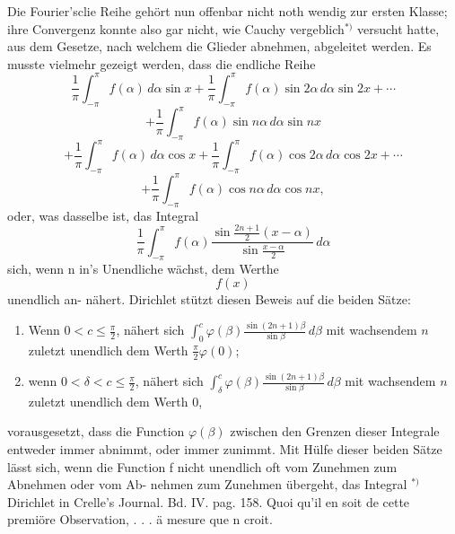 \documentclass[11pt,a4paper]{article}
\begin{document}
Die  Fourier'sclie  Reihe  gehört  nun  offenbar  nicht  noth wendig
zur  ersten  Klasse;  ihre  Convergenz  konnte  also  gar  nicht,  wie  Cauchy
vergeblich$^{*)}$  versucht  hatte,  aus  dem  Gesetze,  nach  welchem  die  Glieder
abnehmen,  abgeleitet  werden.  Es  musste  vielmehr  gezeigt  werden,  dass
die  endliche  Reihe
\[
\frac{1}{\pi} \int_{-\pi}^{\pi} f(\alpha)\, d\alpha \sin x + \frac{1}{\pi} \int_{-\pi}^{\pi} f(\alpha) \sin 2\alpha\, d\alpha \sin 2x + \cdots
\]
\[
+ \frac{1}{\pi} \int_{-\pi}^{\pi} f(\alpha) \sin n\alpha\, d\alpha \sin nx
\]
\[
+ \frac{1}{\pi} \int_{-\pi}^{\pi} f(\alpha)\, d\alpha \cos x + \frac{1}{\pi} \int_{-\pi}^{\pi} f(\alpha) \cos 2\alpha\, d\alpha \cos 2x + \cdots
\]
\[
+ \frac{1}{\pi} \int_{-\pi}^{\pi} f(\alpha) \cos n\alpha\, d\alpha \cos nx,
\]
oder,  was  dasselbe  ist,  das  Integral
\[
\frac{1}{\pi} \int_{-\pi}^{\pi} f(\alpha) \frac{\sin \frac{2n+1}{2}(x-\alpha)}{\sin \frac{x-\alpha}{2}}\, d\alpha
\]
sich,  wenn  n  in's  Unendliche  wächst,  dem  Werthe  $$f(x)$$  unendlich  an-
nähert.
Dirichlet  stützt  diesen  Beweis  auf  die  beiden  Sätze:
\begin{enumerate}
\item Wenn $0 < c \leq \frac{\pi}{2}$, nähert sich $\int_0^c \varphi(\beta) \frac{\sin(2n+1)\beta}{\sin\beta}\, d\beta$ mit wachsendem $n$ zuletzt unendlich dem Werth $\frac{\pi}{2}\varphi(0)$;
\item wenn $0 < \delta < c \leq \frac{\pi}{2}$, nähert sich $\int_\delta^c \varphi(\beta) \frac{\sin(2n+1)\beta}{\sin\beta}\, d\beta$ mit wachsendem $n$ zuletzt unendlich dem Werth $0$,
\end{enumerate}
vorausgesetzt, dass die Function $\varphi(\beta)$ zwischen den Grenzen dieser Integrale entweder immer abnimmt, oder immer zunimmt.
Mit  Hülfe  dieser  beiden  Sätze  lässt  sich,  wenn  die  Function  f
nicht  unendlich  oft  vom  Zunehmen  zum  Abnehmen  oder  vom  Ab-
nehmen zum  Zunehmen  übergeht,  das  Integral
$^{*)}$  Dirichlet   in   Crelle's  Journal.     Bd.  IV.  pag.  158.     Quoi  qu'il  en  soit  de
cette  premiöre  Observation,  .  .  .  ä  mesure  que  n  croit.
\newpage
\end{document}
